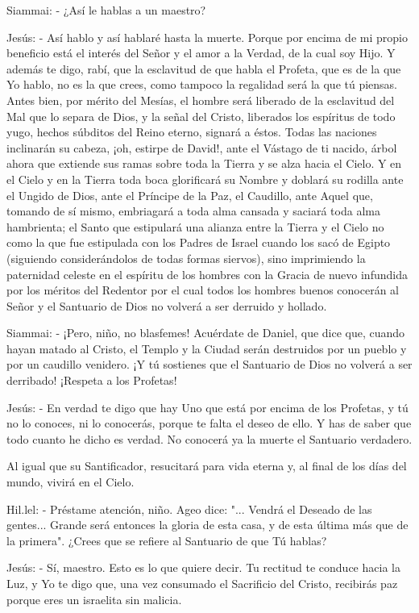 \documentclass[12pt, twoside, openright]{book} %
\begin{document}
Siammai: - ¿Así le hablas a un maestro? 

Jesús: - Así hablo y así hablaré hasta la muerte. Porque por encima de mi propio beneficio está el interés del Señor y el amor a la Verdad, de la cual soy Hijo. Y además te digo, rabí, que la esclavitud de que habla el Profeta, que es de la que Yo hablo, no es la que crees, como tampoco la regalidad será la que tú piensas. Antes bien, por mérito del Mesías, el hombre será liberado de la esclavitud del Mal que lo separa de Dios, y la señal del Cristo, liberados los espíritus de todo yugo, hechos súbditos del Reino eterno, signará a éstos. Todas las naciones inclinarán su cabeza, ¡oh, estirpe de David!, ante el Vástago de ti nacido, árbol ahora que extiende sus ramas sobre toda la Tierra y se alza hacia el Cielo. Y en el Cielo y en la Tierra toda boca glorificará su Nombre y doblará su rodilla ante el Ungido de Dios, ante el Príncipe de la Paz, el Caudillo, ante Aquel que, tomando de sí mismo, embriagará a toda alma cansada y saciará toda alma hambrienta; el Santo que estipulará una alianza entre la Tierra y el Cielo no como la que fue estipulada con los Padres de Israel cuando los sacó de Egipto (siguiendo considerándolos de todas formas siervos), sino imprimiendo la paternidad celeste en el espíritu de los hombres con la Gracia de nuevo infundida por los méritos del Redentor por el cual todos los hombres buenos conocerán al Señor y el Santuario de Dios no volverá a ser derruido y hollado. 

Siammai: - ¡Pero, niño, no blasfemes! Acuérdate de Daniel, que dice que, cuando hayan matado al Cristo, el Templo y la Ciudad serán destruidos por un pueblo y por un caudillo venidero. ¡Y tú sostienes que el Santuario de Dios no volverá a ser derribado! ¡Respeta a los Profetas! 

Jesús: - En verdad te digo que hay Uno que está por encima de los Profetas, y tú no lo conoces, ni lo conocerás, porque te falta el deseo de ello. Y has de saber que todo cuanto he dicho es verdad. No conocerá ya la muerte el Santuario verdadero. 

Al igual que su Santificador, resucitará para vida eterna y, al final de los días del mundo, vivirá en el Cielo. 

Hil.lel: - Préstame atención, niño. Ageo dice: "... Vendrá el Deseado de las gentes... Grande será entonces la gloria de esta casa, y de esta última más que de la primera". ¿Crees que se refiere al Santuario de que Tú hablas? 

Jesús: - Sí, maestro. Esto es lo que quiere decir. Tu rectitud te conduce hacia la Luz, y Yo te digo que, una vez consumado el Sacrificio del Cristo, recibirás paz porque eres un israelita sin malicia.  
\end{document}
